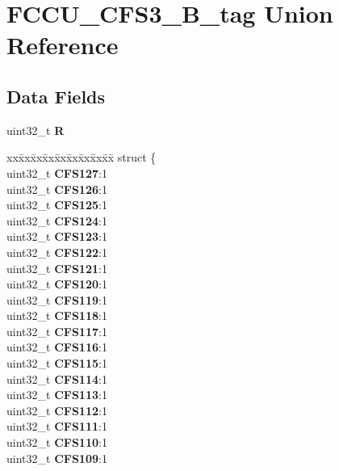 \hypertarget{unionFCCU__CFS3__32B__tag}{}\section{F\+C\+C\+U\+\_\+\+C\+F\+S3\+\_\+B\+\_\+tag Union Reference}
\label{unionFCCU__CFS3__32B__tag}
\subsection*{Data Fields}
\begin{DoxyCompactItemize}
\item 
\mbox{\label{unionFCCU__CFS3__32B__tag_a8cb5f4a9f5f8630edccbef89f584af88}} 
uint32\+\_\+t {\bfseries R}
\item 
\mbox{\label{unionFCCU__CFS3__32B__tag_ab2e69c02b8227530ff23b9c0105f9848}} 
\begin{tabbing}
xx\=xx\=xx\=xx\=xx\=xx\=xx\=xx\=xx\=\kill
struct \{\\
\>uint32\_t {\bfseries CFS127}:1\\
\>uint32\_t {\bfseries CFS126}:1\\
\>uint32\_t {\bfseries CFS125}:1\\
\>uint32\_t {\bfseries CFS124}:1\\
\>uint32\_t {\bfseries CFS123}:1\\
\>uint32\_t {\bfseries CFS122}:1\\
\>uint32\_t {\bfseries CFS121}:1\\
\>uint32\_t {\bfseries CFS120}:1\\
\>uint32\_t {\bfseries CFS119}:1\\
\>uint32\_t {\bfseries CFS118}:1\\
\>uint32\_t {\bfseries CFS117}:1\\
\>uint32\_t {\bfseries CFS116}:1\\
\>uint32\_t {\bfseries CFS115}:1\\
\>uint32\_t {\bfseries CFS114}:1\\
\>uint32\_t {\bfseries CFS113}:1\\
\>uint32\_t {\bfseries CFS112}:1\\
\>uint32\_t {\bfseries CFS111}:1\\
\>uint32\_t {\bfseries CFS110}:1\\
\>uint32\_t {\bfseries CFS109}:1\\

\end{tabbing}
\end{DoxyCompactItemize}
